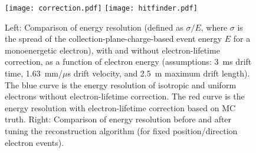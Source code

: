 \begin{figure}[!htb] %
 \centering
\texttt{[image: correction.pdf]} 
\texttt{[image: hitfinder.pdf]} 

 \caption[Comparisons of energy resolution]{Left: Comparison of energy
   resolution (defined as $\sigma/E$, where $\sigma$ is the spread of
   the collection-plane-charge-based event energy $E$ for a
   monoenergetic electron), with and without electron-lifetime
   correction, as a function of electron energy (assumptions: 3~ms drift time, 1.63~mm/$\mu$s drift velocity, and 2.5~m maximum drift length). The blue curve is the
   energy resolution of isotropic and uniform electrons without
   electron-lifetime correction. The red curve is the energy
   resolution with electron-lifetime correction based on MC truth.
   Right: Comparison of energy resolution before and after tuning the
   reconstruction algorithm (for fixed position/direction electron
   events).}\label{fig:lowe_res}
\end{figure}


